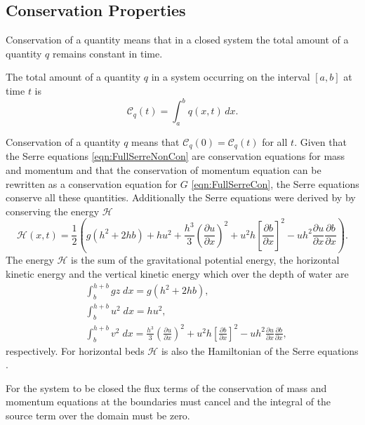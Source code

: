 \subsection{Conservation Properties}
Conservation of a quantity means that in a closed system the total amount of a quantity $q$ remains constant in time.
\begin{defn}
	\label{defn:TotalAmmountab}
	The total amount of a quantity $q$ in a system occurring on the interval $[a,b]$ at time $t$ is
	\begin{equation*}
	\mathcal{C}_q(t) = \int_{a}^{b} q(x,t)\, dx.
	\end{equation*}
\end{defn}
Conservation of a quantity $q$ means that $\mathcal{C}_{q}(0) = \mathcal{C}_{q}(t)$ for all $t$. Given that the Serre equations \eqref{eqn:FullSerreNonCon} are conservation equations for mass and momentum and that the conservation of momentum equation can be rewritten as a conservation equation for $G$ \eqref{eqn:FullSerreCon}, the Serre equations conserve all these quantities. Additionally the Serre equations were derived by \citet{Green-Naghdi-1976-237} by conserving the energy $\mathcal{H}$
\begin{equation}
	\mathcal{H}(x,t) = \frac{1}{2} \left( g\left(h^2 + 2hb\right) + hu^2  + \frac{h^3}{3} \left(\frac{\partial u}{\partial x}\right)^2 + u^2h\left[\frac{\partial b}{\partial x}\right]^2 - uh^2 \frac{\partial u}{\partial x} \frac{\partial b}{\partial x}  \right).
	\label{eqn:Hamildef}
\end{equation}
The energy $\mathcal{H}$ is the sum of the gravitational potential energy, the horizontal kinetic energy and the vertical kinetic energy which over the depth of water are
\begin{align}
& \int_{b}^{h +b} gz \; dx = g\left(h^2 + 2hb\right), \\
& \int_{b}^{h +b} u^2 \; dx = hu^2, \\
& \int_{b}^{h +b} v^2 \; dx = \frac{h^3}{3} \left(\frac{\partial u}{\partial x}\right)^2 + u^2h\left[\frac{\partial b}{\partial x}\right]^2 - uh^2 \frac{\partial u}{\partial x} \frac{\partial b}{\partial x},
\end{align}
respectively. For horizontal beds $\mathcal{H}$ is also the Hamiltonian of the Serre equations \cite{Li-Y-2002}. 
 
For the system to be closed the flux terms of the conservation of mass and momentum equations at the boundaries must cancel and the integral of the source term over the domain must be zero.

